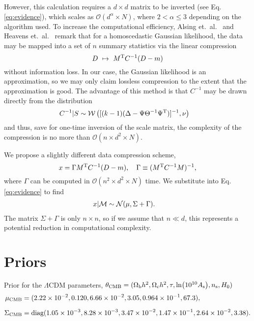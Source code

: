 \documentclass[%
 reprint,
 amsmath,amssymb,
 aps,
]{revtex4-2}
\begin{document}
\begin{widetext}
However, this calculation requires a $d\times d$ matrix to be inverted (see Eq. \ref{eq:evidence}), which scales as $\mathcal{O}(d^\alpha \times N)$, where $2<\alpha\leqslant3$ depending on the algorithm used. To increase the computational efficiency, Alsing et.\ al.\ \cite{alsing2018generalized, alsing2018massive} and Heavens et.\ al.\ \cite{heavens2000massive} remark that for a homoscedastic Gaussian likelihood, the data may be mapped into a set of $n$ summary statistics via the linear compression
\begin{equation} \label{eq:compression}
	D \ \mapsto \ M^{\mathrm{T}} C^{-1}(D-m)
\end{equation}
without information loss. In our case, the Gaussian likelihood is an approximation, so we may only claim lossless compression to the extent that the approximation is good. The advantage of this method is that $C^{-1}$ may be drawn directly from the distribution
\begin{align}
	C^{-1}|S &\sim \mathcal{W}\left( [(k-1)(\Delta -  \Psi \Theta^{-1}\Psi^{\mathrm{T}})]^{-1}, \nu  \right)
\end{align}
and thus, save for one-time inversion of the scale matrix, the complexity of the compression is no more than $\mathcal{O}(n\times d^2\times N)$.

We propose a slightly different data compression scheme,
\begin{equation}
	 x = \Gamma M^{\mathrm{T}} C^{-1}(D-m), \quad \Gamma \equiv (M^{\mathrm{T}} C^{-1}M)^{-1},
\end{equation} where $\Gamma$ can be computed in $\mathcal{O}(n^2\times d^2 \times N)$ time. We substitute into Eq. \ref{eq:evidence} to find
\begin{align*}
	x|\mathcal{M} &\sim \mathcal{N}(\mu,\Sigma + \Gamma).
\end{align*}
The matrix $\Sigma+\Gamma$ is only $n\times n$, so if we assume that $n\ll d$, this represents a potential reduction in computational complexity.



\section{Priors} \label{ap:B}


\noindent Prior for the $\Lambda$CDM parameters, $\theta_\text{CMB} = (\Omega_\text{b}h^2, \Omega_\text{c}h^2, \tau, \ln(10^{10}A_\text{s}), n_\text{s},H_0)$
\begin{align}
\mu_\text{CMB} &= (2.22\times10^{-2}, 0.120, 6.66\times10^{-2}, 3.05, 0.964\times10^{-1}, 67.3),
\label{eq:prior_CMB_1}\\[2mm]
\Sigma_\text{CMB} &= \text{diag}(1.05\times10^{-3}, 8.28\times10^{-3}, 3.47\times10^{-2}, 1.47\times10^{-1}, 2.64\times10^{-2}, 3.38). \label{eq:prior_CMB_2}
\end{align}
\vfill
\pagebreak
\end{widetext}






\end{document}
